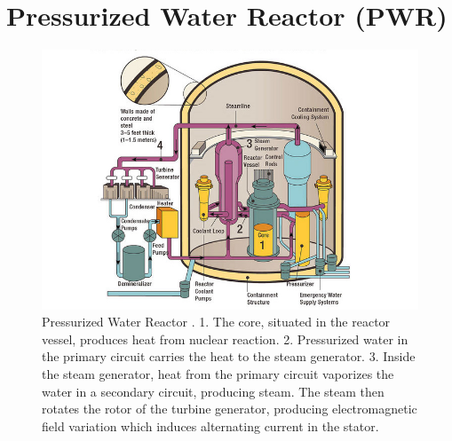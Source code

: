 \chapter{Pressurized Water Reactor (PWR)}
\label{ch:pwr}
\begin{figure}[H]
    \centering
    \vspace{-1cm}
    \includegraphics[width=\linewidth]{figures/pwr.jpg}
    \caption{Pressurized Water Reactor \cite{imgPwr}. 1. The core, situated in the reactor vessel, produces heat from nuclear reaction. 2. Pressurized water in the primary circuit carries the heat to the steam generator. 3. Inside the steam generator, heat from the primary circuit vaporizes the water in a secondary circuit, producing steam. The steam then rotates the rotor of the turbine generator, producing electromagnetic field variation which induces alternating current in the stator.}
    \label{fig:pwr}
    \hfill
\end{figure}
 
